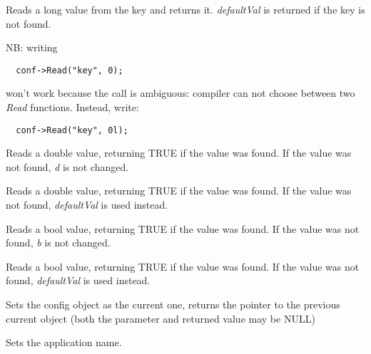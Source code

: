 Reads a long value from the key and returns it. {\it defaultVal} is returned if the key is not
found.

NB: writing

{\small
\begin{verbatim}
  conf->Read("key", 0);
\end{verbatim}
}

won't work because the call is ambiguous: compiler can not choose between two {\it Read} functions. Instead, write:

{\small
\begin{verbatim}
  conf->Read("key", 0l);
\end{verbatim}
}


Reads a double value, returning TRUE if the value was
found. If the value was not found, {\it d} is not changed.


Reads a double value, returning TRUE if the value was
found. If the value was not found, {\it defaultVal} is used instead.


Reads a bool value, returning TRUE if the value was
found. If the value was not found, {\it b} is not changed.


Reads a bool value, returning TRUE if the value was
found. If the value was not found, {\it defaultVal} is used instead.

\label{wxconfigbaseset}


Sets the config object as the current one, returns the pointer to the previous
current object (both the parameter and returned value may be NULL)

\label{wxconfigbasesetappname}


Sets the application name.

\label{wxconfigbasesetexpandingenvvars}

